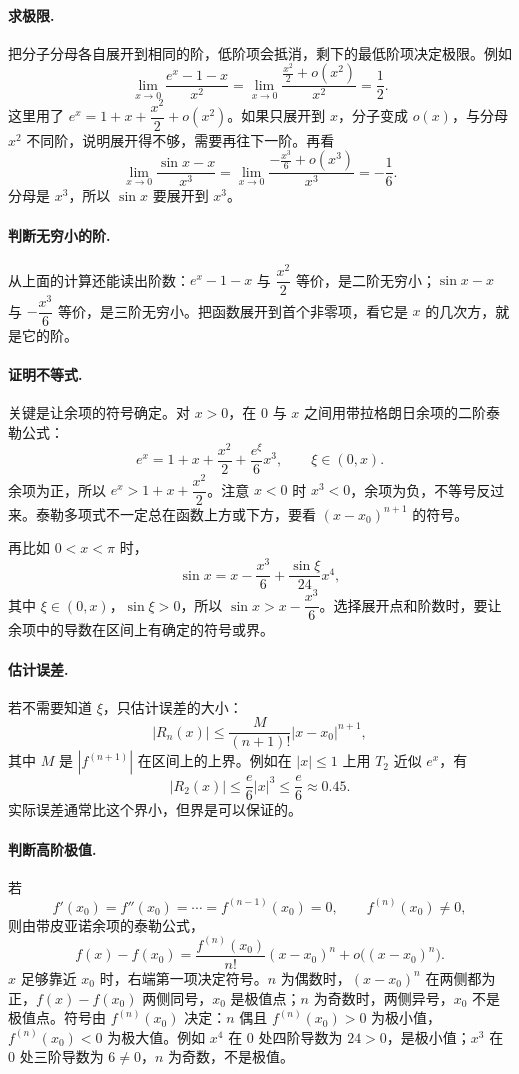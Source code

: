 \paragraph{求极限.} 把分子分母各自展开到相同的阶，低阶项会抵消，剩下的最低阶项决定极限。例如
\[
\lim_{x\to0}\frac{e^x-1-x}{x^2}
=\lim_{x\to0}\frac{\frac{x^2}{2}+o(x^2)}{x^2}
=\frac12.
\]
这里用了 $e^x=1+x+\dfrac{x^2}{2}+o(x^2)$。如果只展开到 $x$，分子变成 $o(x)$，与分母 $x^2$ 不同阶，说明展开得不够，需要再往下一阶。再看
\[
\lim_{x\to0}\frac{\sin x-x}{x^3}
=\lim_{x\to0}\frac{-\frac{x^3}{6}+o(x^3)}{x^3}
=-\frac16.
\]
分母是 $x^3$，所以 $\sin x$ 要展开到 $x^3$。

\paragraph{判断无穷小的阶.} 从上面的计算还能读出阶数：$e^x-1-x$ 与 $\dfrac{x^2}{2}$ 等价，是二阶无穷小；$\sin x-x$ 与 $-\dfrac{x^3}{6}$ 等价，是三阶无穷小。把函数展开到首个非零项，看它是 $x$ 的几次方，就是它的阶。

\paragraph{证明不等式.} 关键是让余项的符号确定。对 $x>0$，在 $0$ 与 $x$ 之间用带拉格朗日余项的二阶泰勒公式：
\[
e^x=1+x+\frac{x^2}{2}+\frac{e^\xi}{6}x^3,\qquad \xi\in(0,x).
\]
余项为正，所以 $e^x>1+x+\dfrac{x^2}{2}$。注意 $x<0$ 时 $x^3<0$，余项为负，不等号反过来。泰勒多项式不一定总在函数上方或下方，要看 $(x-x_0)^{n+1}$ 的符号。

再比如 $0<x<\pi$ 时，
\[
\sin x=x-\frac{x^3}{6}+\frac{\sin\xi}{24}x^4,
\]
其中 $\xi\in(0,x)$，$\sin\xi>0$，所以 $\sin x>x-\dfrac{x^3}{6}$。选择展开点和阶数时，要让余项中的导数在区间上有确定的符号或界。

\paragraph{估计误差.} 若不需要知道 $\xi$，只估计误差的大小：
\[
|R_n(x)|\le \frac{M}{(n+1)!}|x-x_0|^{n+1},
\]
其中 $M$ 是 $|f^{(n+1)}|$ 在区间上的上界。例如在 $|x|\le1$ 上用 $T_2$ 近似 $e^x$，有
\[
|R_2(x)|\le\frac{e}{6}|x|^3\le\frac{e}{6}\approx0.45.
\]
实际误差通常比这个界小，但界是可以保证的。

\paragraph{判断高阶极值.} 若
\[
f'(x_0)=f''(x_0)=\cdots=f^{(n-1)}(x_0)=0,\qquad f^{(n)}(x_0)\ne0,
\]
则由带皮亚诺余项的泰勒公式，
\[
f(x)-f(x_0)=\frac{f^{(n)}(x_0)}{n!}(x-x_0)^n+o\bigl((x-x_0)^n\bigr).
\]
$x$ 足够靠近 $x_0$ 时，右端第一项决定符号。$n$ 为偶数时，$(x-x_0)^n$ 在两侧都为正，$f(x)-f(x_0)$ 两侧同号，$x_0$ 是极值点；$n$ 为奇数时，两侧异号，$x_0$ 不是极值点。符号由 $f^{(n)}(x_0)$ 决定：$n$ 偶且 $f^{(n)}(x_0)>0$ 为极小值，$f^{(n)}(x_0)<0$ 为极大值。例如 $x^4$ 在 $0$ 处四阶导数为 $24>0$，是极小值；$x^3$ 在 $0$ 处三阶导数为 $6\ne0$，$n$ 为奇数，不是极值。

\newpage

